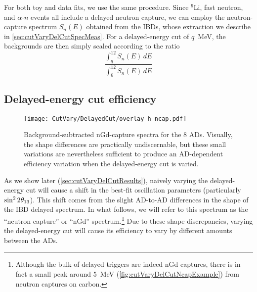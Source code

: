 \documentclass[../thesis.tex]{subfiles}
\begin{document}
For both toy and data fits, we use the same procedure. Since $^9$Li, fast neutron, and $\alpha$-$n$ events all include a delayed neutron capture, we can employ the neutron-capture spectrum $S_n(E)$ obtained from the IBDs, whose extraction we describe in \autoref{sec:cutVaryDelCutSpecMeas}. For a delayed-energy cut of $q$~MeV, the backgrounds are then simply scaled according to the ratio
\begin{equation}
  \label{eq:cutVaryDelCutCorrBkgScale}
  \frac{\int_q^{12} S_n(E)\,dE}{\int_6^{12} S_n(E)\,dE}
\end{equation}

\subsection{Delayed-energy cut efficiency}
\label{sec:cutVaryDelCutEff}

\begin{figure}[ht]
  \texttt{[image: CutVary/DelayedCut/overlay\_h\_ncap.pdf]}
  \caption{Background-subtracted nGd-capture spectra for the 8 ADs. Visually, the shape differences are practically undiscernable, but these small variations are nevertheless sufficient to produce an AD-dependent efficiency variation when the delayed-energy cut is varied.}
  \label{fig:cutVaryDelCutSpecOverlay}
\end{figure}

As we show later (\autoref{sec:cutVaryDelCutResults}), naively varying the delayed-energy cut will cause a shift in the best-fit oscillation parameters (particularly $\sin^2 2\theta_{13}$). This shift comes from the slight AD-to-AD differences in the shape of the IBD delayed spectrum. In what follows, we will refer to this spectrum as the ``neutron capture'' or ``nGd'' spectrum.\footnote{Although the bulk of delayed triggers are indeed nGd captures, there is in fact a small peak around 5~MeV (\autoref{fig:cutVaryDelCutNcapExample}) from neutron captures on carbon.} Due to these shape discrepancies, varying the delayed-energy cut will cause its efficiency to vary by different amounts between the ADs.
\end{document}
